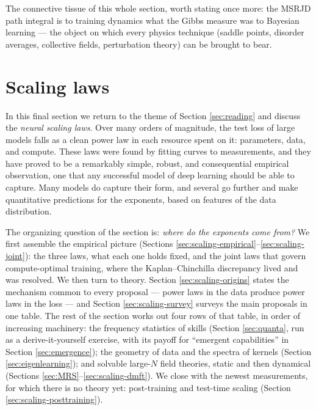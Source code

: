 \documentclass[11pt]{article}
\begin{document}
The connective tissue of this whole section, worth stating once more: the MSRJD path integral is to training dynamics what the Gibbs measure was to Bayesian learning --- the object on which every physics technique (saddle points, disorder averages, collective fields, perturbation theory) can be brought to bear.

\section{Scaling laws}
\label{sec:scaling}

In this final section we return to the theme of Section \ref{sec:reading} and discuss the \emph{neural scaling laws}. Over many orders of magnitude, the test loss of large models falls as a clean power law in each resource spent on it: parameters, data, and compute. These laws were found by fitting curves to measurements, and they have proved to be a remarkably simple, robust, and consequential empirical observation, one that any successful model of deep learning should be able to capture. Many models do capture their form, and several go further and make quantitative predictions for the exponents, based on features of the data distribution.

The organizing question of the section is: \emph{where do the exponents come from?} We first assemble the empirical picture (Sections \ref{sec:scaling-empirical}--\ref{sec:scaling-joint}): the three laws, what each one holds fixed, and the joint laws that govern compute-optimal training, where the Kaplan--Chinchilla discrepancy lived and was resolved. We then turn to theory. Section \ref{sec:scaling-origins} states the mechanism common to every proposal --- power laws in the data produce power laws in the loss --- and Section \ref{sec:scaling-survey} surveys the main proposals in one table. The rest of the section works out four rows of that table, in order of increasing machinery: the frequency statistics of skills (Section \ref{sec:quanta}, run as a derive-it-yourself exercise, with its payoff for ``emergent capabilities'' in Section \ref{sec:emergence}); the geometry of data and the spectra of kernels (Section \ref{sec:eigenlearning}); and solvable large-$N$ field theories, static and then dynamical (Sections \ref{sec:MRS}--\ref{sec:scaling-dmft}). We close with the newest measurements, for which there is no theory yet: post-training and test-time scaling (Section \ref{sec:scaling-posttraining}).
\end{document}
